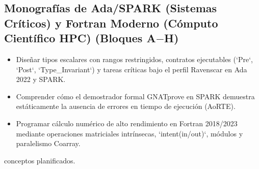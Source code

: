 \documentclass{book}
\begin{document}
\subsection*{\checkmark Monografías de Ada/SPARK (Sistemas Críticos) y Fortran Moderno (Cómputo Científico HPC) (Bloques A\(-\)H)}
\begin{itemize}
\item Diseñar tipos escalares con rangos restringidos, contratos ejecutables (`Pre`, `Post`, `Type\_Invariant`) y tareas críticas bajo el perfil Ravenscar en Ada 2022 y SPARK.
\item Comprender cómo el demostrador formal GNATprove en SPARK demuestra estáticamente la ausencia de errores en tiempo de ejecución (AoRTE).
\item Programar cálculo numérico de alto rendimiento en Fortran 2018/2023 mediante operaciones matriciales intrínsecas, `intent(in/out)`, módulos y paralelismo Coarray.
\end{itemize}
 conceptos planificados.
\backmatter
\end{document}
